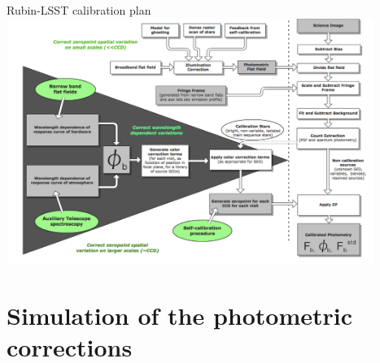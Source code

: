 \documentclass{beamer}
\begin{document}
\begin{frame}{Rubin-LSST calibration plan}
\includegraphics[width=12cm, height=8cm]{figs/calib/LSSTCalibrationPlan.png}
\end{frame}


\section{Simulation of the photometric corrections}
\end{document}
